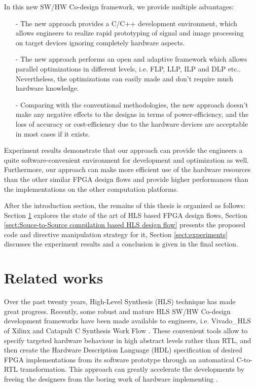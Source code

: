 \documentclass[10pt,twocolumn,letterpaper]{article}
\begin{document}
In this new SW/HW Co-design framework, we provide multiple advantages:
\begin{itemize}
\item[-] The new approach provides a C/C++ development environment, which allows engineers to realize rapid prototyping of signal and image processing on target devices ignoring completely hardware aspects.
\item[-] The new approach performs an open and adaptive framework which allows parallel optimizations in different levels, i.e. FLP, LLP, ILP and DLP etc.. Nevertheless, the optimizations can easily made and don't require much hardware knowledge.
\item[-] Comparing with the conventional methodologies, the new approach doesn't make any negative effects to the designs in terms of power-efficiency, and the loss of accuracy or cost-efficiency due to the hardware devices are acceptable in most cases if it exists.
\end{itemize}

Experiment results demonstrate that our approach can provide the engineers a quite software-convenient environment for development and optimization as well. Furthermore, our approach can make more efficient use of the hardware resources than the other similar FPGA design flows and provide higher performances than the implementations on the other computation platforms.

After the introduction section, the remains of this thesis is organized as follows: Section \ref{sect:related works} explores the state of the art of HLS based FPGA design flows, Section \ref{sect:Souce-to-Source compilation based HLS design flow} presents the proposed code and directive manipulation strategy for it, Section \ref{sect:experiments} discusses the experiment results and a conclusion is given in the final section.

\section{Related works}
\label{sect:related works}
Over the past twenty years, High-Level Synthesis (HLS) technique has made great progress. Recently, some robust and mature HLS SW/HW Co-design development frameworks have been made available to engineers, i.e. Vivado\_HLS of Xilinx \cite{59} and Catapult C Synthesis Work Flow \cite{60}. These convenient tools allow to specify targeted hardware behaviour in high abstract levels rather than RTL, and then create the Hardware Description Language (HDL) specification of desired FPGA implementations from its software prototype through an automatical C-to-RTL transformation. This approach can greatly accelerate the developments by freeing the designers from the boring work of hardware implementing \cite{30}.
\end{document}
